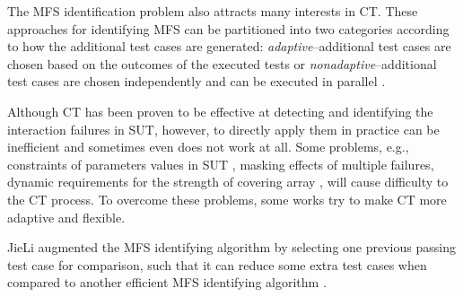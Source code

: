 \documentclass[journal,12pt,onecolumn,draftclsnofoot,]{IEEEtran}
\begin{document}
The MFS identification problem also attracts many interests in CT. These approaches for identifying MFS can be partitioned into two categories \cite{colbourn2008locating} according to how the additional test cases are generated: \emph{adaptive}--additional test cases are chosen based on the outcomes of the executed tests \cite{shi2005software,nie2011minimal,ghandehari2012identifying,niu2013identifying,zhang2011characterizing,shakya2012isolating,wang2010adaptive,li2012improved}or \emph{nonadaptive}--additional test cases are chosen independently and can be executed in parallel \cite{yilmaz2006covering,colbourn2008locating,martinez2008algorithms,martinez2009locating,zhang2012faulty}.


Although CT has been proven to be effective at detecting and identifying the interaction failures in SUT, however, to directly apply them in practice can be inefficient and sometimes even does not work at all. Some problems, e.g., constraints of parameters values in SUT \cite{cohen2007exploiting,cohen2008constructing}, masking effects of multiple failures\cite{dumlu2011feedback,yilmaz2013reducing}, dynamic requirements for the strength of covering array \cite{fouche2009incremental}, will cause difficulty to the CT process. To overcome these problems, some works try to make CT more adaptive and flexible.


JieLi \cite{li2012improved} augmented the MFS identifying algorithm by selecting one previous passing test case for comparison, such that it can reduce some extra test cases when compared to another efficient MFS identifying algorithm \cite{zhang2011characterizing}.
\end{document}

